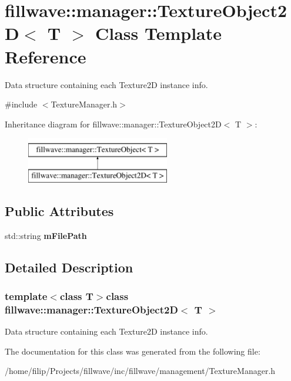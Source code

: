 \hypertarget{classfillwave_1_1manager_1_1TextureObject2D}{}\section{fillwave\+:\+:manager\+:\+:Texture\+Object2\+D$<$ T $>$ Class Template Reference}
\label{classfillwave_1_1manager_1_1TextureObject2D}


Data structure containing each Texture2\+D instance info.  




{\ttfamily \#include $<$Texture\+Manager.\+h$>$}

Inheritance diagram for fillwave\+:\+:manager\+:\+:Texture\+Object2\+D$<$ T $>$\+:\begin{figure}[H]
\begin{center}
\leavevmode
\includegraphics[height=2.000000cm]{classfillwave_1_1manager_1_1TextureObject2D}
\end{center}
\end{figure}
\subsection*{Public Attributes}
\begin{DoxyCompactItemize}
\item 
\hypertarget{classfillwave_1_1manager_1_1TextureObject2D_a016bf3b529e36fe2c9193844e47d9eff}{}std\+::string {\bfseries m\+File\+Path}\label{classfillwave_1_1manager_1_1TextureObject2D_a016bf3b529e36fe2c9193844e47d9eff}

\end{DoxyCompactItemize}


\subsection{Detailed Description}
\subsubsection*{template$<$class T$>$class fillwave\+::manager\+::\+Texture\+Object2\+D$<$ T $>$}

Data structure containing each Texture2\+D instance info. 

The documentation for this class was generated from the following file\+:\begin{DoxyCompactItemize}
\item 
/home/filip/\+Projects/fillwave/inc/fillwave/management/Texture\+Manager.\+h\end{DoxyCompactItemize}
